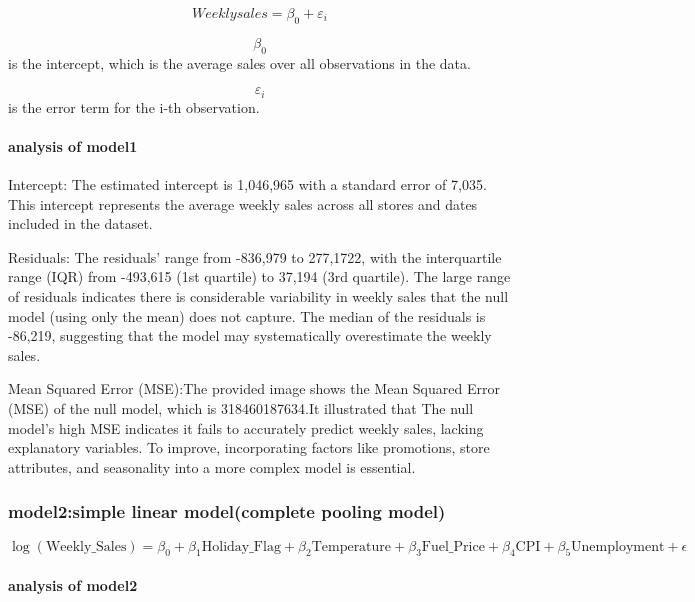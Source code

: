 \documentclass[
  letterpaper,
  DIV=11,
  numbers=noendperiod]{scrartcl}
\let\oldparagraph\paragraph
\renewcommand{\paragraph}[1]{\oldparagraph{#1}\mbox{}}
\begin{document}
\[Weeklysales = \beta_0 + \varepsilon_i\]

\[\beta_0\] is the intercept, which is the average sales over all
observations in the data.

\[\varepsilon_i\] is the error term for the i-th observation.

\hypertarget{analysis-of-model1}{%
\paragraph{analysis of model1}\label{analysis-of-model1}}

Intercept: The estimated intercept is 1,046,965 with a standard error of
7,035. This intercept represents the average weekly sales across all
stores and dates included in the dataset.

Residuals: The residuals' range from -836,979 to 277,1722, with the
interquartile range (IQR) from -493,615 (1st quartile) to 37,194 (3rd
quartile). The large range of residuals indicates there is considerable
variability in weekly sales that the null model (using only the mean)
does not capture. The median of the residuals is -86,219, suggesting
that the model may systematically overestimate the weekly sales.

Mean Squared Error (MSE):The provided image shows the Mean Squared Error
(MSE) of the null model, which is 318460187634.It illustrated that The
null model's high MSE indicates it fails to accurately predict weekly
sales, lacking explanatory variables. To improve, incorporating factors
like promotions, store attributes, and seasonality into a more complex
model is essential.

\hypertarget{model2simple-linear-modelcomplete-pooling-model}{%
\subsubsection{model2:simple linear model(complete pooling
model)}\label{model2simple-linear-modelcomplete-pooling-model}}

\[\log(\text{Weekly_Sales}) = \beta_0 + \beta_1 \text{Holiday_Flag} + \beta_2 \text{Temperature} + \beta_3 \text{Fuel_Price} + \beta_4 \text{CPI} + \beta_5 \text{Unemployment} + \epsilon\]

\hypertarget{analysis-of-model2}{%
\paragraph{analysis of model2}\label{analysis-of-model2}}
\end{document}
